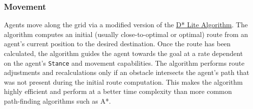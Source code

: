 \documentclass[
    a4paper,
    english,
    DIV=16,
    11pt,
    parskip=half,
    listof=totoc,		%
    index=totoc,		%
    bibliography=totoc,	%
]{scrartcl}
\begin{document}
\subsubsection{Movement} \label{movement}
Agents move along the grid via a modified version of the \href{http://idm-lab.org/bib/abstracts/papers/aaai02b.pdf}{D* Lite Algorithm}. The algorithm computes an initial (usually close-to-optimal or optimal) route from an agent's current position to the desired destination. Once the route has been calculated, the algorithm guides the agent towards the goal at a rate dependent on the agent's \texttt{Stance} and movement capabilities. The algorithm performs route adjustments and recalculations only if an obstacle intersects the agent's path that was not present during the initial route computation. This makes the algorithm highly efficient and perform at a better time complexity than more common path-finding algorithms such as A*.
\end{document}

